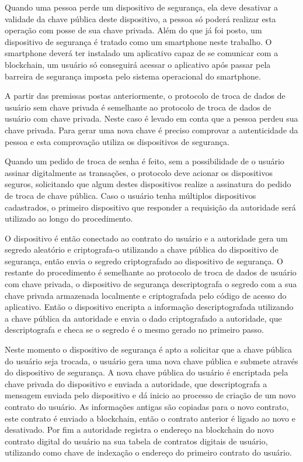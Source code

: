 \documentclass[tcc,capa]{texufpel}
\begin{document}
        Quando uma pessoa perde um dispositivo de segurança, ela deve desativar a validade da chave pública deste dispositivo, a pessoa só poderá realizar esta operação com posse de sua chave privada. Além do que já foi posto, um dispositivo de segurança é tratado como um smartphone neste trabalho. O smartphone deverá ter instalado um aplicativo capaz de se comunicar com a blockchain, um usuário só conseguirá acessar o aplicativo após passar pela barreira de segurança imposta pelo sistema operacional do smartphone.
        
        A partir das premissas postas anteriormente, o protocolo de troca de dados de usuário sem chave privada é semelhante ao protocolo de troca de dados de usuário com chave privada. Neste caso é levado em conta que a pessoa perdeu sua chave privada. Para gerar uma nova chave é preciso comprovar a autenticidade da pessoa e esta comprovação utiliza os dispositivos de segurança.
        
        Quando um pedido de troca de senha é feito, sem a possibilidade de o usuário assinar digitalmente as transações, o protocolo deve acionar os dispositivos seguros, solicitando que algum destes dispositivos realize a assinatura do pedido de troca de chave pública. Caso o usuário tenha múltiplos dispositivos cadastrados, o primeiro dispositivo que responder a requisição da autoridade será utilizado ao longo do procedimento.
        
        O dispositivo é então conectado ao contrato do usuário e a autoridade gera um segredo aleatório e criptografa-o utilizando a chave pública do dispositivo de segurança, então envia o segredo criptografado ao dispositivo de segurança. O restante do procedimento é semelhante ao protocolo de troca de dados de usuário com chave privada, o dispositivo de segurança descriptografa o segredo com a sua chave privada armazenada localmente e criptografada pelo código de acesso do aplicativo. Então o dispositivo encripta a informação descriptografada utilizando a chave pública da autoridade e envia o dado criptografado a autoridade, que descriptografa e checa se o segredo é o mesmo gerado no primeiro passo.
        
        Neste momento o dispositivo de segurança é apto a solicitar que a chave pública do usuário seja trocada, o usuário gera uma nova chave pública e submete através do dispositivo de segurança. A nova chave pública do usuário é encriptada pela chave privada do dispositivo e enviada a autoridade, que descriptografa a mensagem enviada pelo dispositivo e dá inicio ao processo de criação de um novo contrato do usuário. As informações antigas são copiadas para o novo contrato, este contrato é enviado a blockchain, então o contrato anterior é ligado ao novo e desativado. Por fim a autoridade registra o endereço na blockchain do novo contrato digital do usuário na sua tabela de contratos digitais de usuário, utilizando como chave de indexação o endereço do primeiro contrato do usuário.
        
\end{document}
